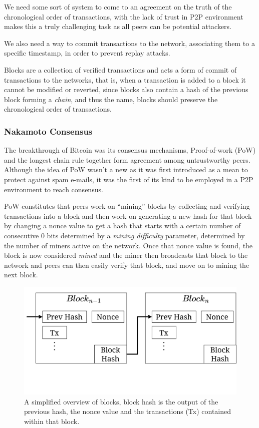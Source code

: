 \documentclass[12pt,twocolumn]{article}
\begin{document}
We need some sort of system to come to an agreement on the truth of the chronological order of transactions,
with the lack of trust in P2P environment makes this a truly challenging task as all peers can be potential attackers.

We also need a way to commit transactions to the network, associating them to a specific timestamp, in order to prevent replay attacks. 

Blocks are a collection of verified transactions and acts a form of commit of transactions to the networks, that is, when a transaction is added
to a block it cannot be modified or reverted, since blocks also contain a hash of
the previous block forming a \textit{chain}, and thus the name, blocks should preserve the chronological order of transactions.


\subsubsection{Nakamoto Consensus}
The breakthrough of Bitcoin was its consensus mechanisms, Proof-of-work (PoW) and the longest chain rule together form agreement among untrustworthy peers.
Although the idea of PoW wasn't a new as it was first introduced as a mean to protect against spam e-mails\cite{pow:origin}, 
it was the first of its kind to be employed in a P2P environment to reach consensus. 


PoW constitutes that peers work on ``mining'' blocks by collecting and verifying transactions into a block and then work on generating a new hash
for that block by changing a nonce value to get a hash that starts with a certain number of consecutive $0$ bits determined by a 
\textit{mining difficulty} parameter, determined by the number of miners active on the network.
Once that nonce value is found, the block is now considered \textit{mined} and the miner then broadcasts that block
to the network and peers can then easily verify that block, and move on to mining the next block.

\begin{figure}
    \includegraphics[width=\linewidth]{fig/blocks.png}
    \caption{A simplified overview of blocks, block hash is the output of the previous hash, the nonce value and the transactions (Tx) contained within that block.}
\end{figure}
\end{document}
